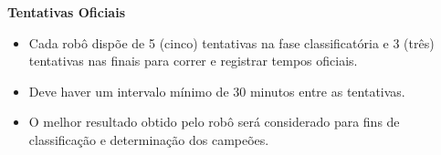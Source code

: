 \bigskip

{\bfseries Tentativas Oficiais}

\headlinebox

\begin{itemize}
	\item Cada robô dispõe de 5 (cinco) tentativas na fase classificatória e 3 (três) tentativas nas finais para correr e registrar tempos oficiais.
	\item Deve haver um intervalo mínimo de 30 minutos entre as tentativas.
	\item O melhor resultado obtido pelo robô será considerado para fins de classificação e determinação dos campeões.
\end{itemize}